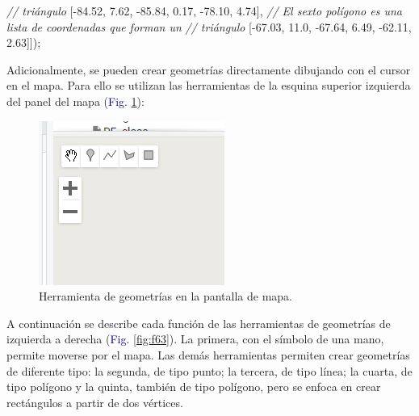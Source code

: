 \documentclass[
  12pt,
  letterpaper,
  twoside]{book}
\newenvironment{Shaded}{\begin{snugshade}}{\end{snugshade}}
\newcommand{\CommentTok}[1]{\textcolor[rgb]{0.24,0.58,0.00}{\textit{#1}}}
\newcommand{\FloatTok}[1]{\textcolor[rgb]{0.28,0.53,0.93}{#1}}
\newcommand{\NormalTok}[1]{#1}
\newcommand{\OperatorTok}[1]{\textcolor[rgb]{0.00,0.00,0.00}{#1}}
\begin{document}
\begin{Shaded}
\begin{Highlighting}[]
    \CommentTok{// triángulo}
\NormalTok{    [}\OperatorTok{{-}}\FloatTok{84.52}\OperatorTok{,} \FloatTok{7.62}\OperatorTok{,}         
     \OperatorTok{{-}}\FloatTok{85.84}\OperatorTok{,} \FloatTok{0.17}\OperatorTok{,}
     \OperatorTok{{-}}\FloatTok{78.10}\OperatorTok{,} \FloatTok{4.74}\NormalTok{]}\OperatorTok{,}
    \CommentTok{// El sexto polígono es una lista de coordenadas que forman un }
    \CommentTok{// triángulo}
\NormalTok{    [}\OperatorTok{{-}}\FloatTok{67.03}\OperatorTok{,} \FloatTok{11.0}\OperatorTok{,}         
     \OperatorTok{{-}}\FloatTok{67.64}\OperatorTok{,} \FloatTok{6.49}\OperatorTok{,}
     \OperatorTok{{-}}\FloatTok{62.11}\OperatorTok{,} \FloatTok{2.63}\NormalTok{]])}\OperatorTok{;}
\end{Highlighting}
\end{Shaded}

Adicionalmente, se pueden crear geometrías directamente dibujando con el cursor en el mapa. Para ello se utilizan las herramientas de la esquina superior izquierda del panel del mapa (\textcolor{darkblue}{Fig.} \ref{fig:f62}):

\begin{figure}[H]

{\centering \includegraphics[width=0.5\linewidth]{Img/geometrias} 

}

\caption{Herramienta de geometrías en la pantalla de mapa.}\label{fig:f62}
\end{figure}

A continuación se describe cada función de las herramientas de geometrías de izquierda a derecha (\textcolor{darkblue}{Fig.} \ref{fig:f63}). La primera, con el símbolo de una mano, permite moverse por el mapa. Las demás herramientas permiten crear geometrías de diferente tipo: la segunda, de tipo punto; la tercera, de tipo línea; la cuarta, de tipo polígono y la quinta, también de tipo polígono, pero se enfoca en crear rectángulos a partir de dos vértices.
\end{document}

